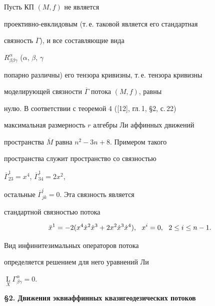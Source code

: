 \begin{pf}


Пусть КП $(M,f) $ не является


проективно-евклидовым (т.\,е. таковой является его стандартная


связность $\overline{\Gamma} $), и все составляющие вида


$R^{\alpha}_{\beta \beta \gamma} $ ($\alpha $, $\beta$, $\gamma$


попарно различны) его тензора кривизны, т.\,е. тензора кривизны


моделирующей связности $\overline{\Gamma} $ потока $(M,f) $, равны


нулю. В соответствии с теоремой 4 ([12], гл.\,1, \S 2, с.\,22)


максимальная размерность $r$ алгебры Ли аффинных движений


пространства $\overline{M} $ равна $n^2-3n+8$. Примером такого


пространства служит пространство со связностью


$\overline{\Gamma}^1_{23}=x^4 $, $\overline{\Gamma}^1_{34}=2x^2 $,


остальные $\overline{\Gamma}^i_{jk}=0$. Эта связность является


стандартной связностью потока


$$


\Ddot{x}^1=-2(x^4\dot{x}^2\dot{x}^3+2x^2\dot{x}^3 \dot{x}^4),\ \


x^i=0,\ \ 2\leq i \leq n-1.


$$





Вид инфинитезимальных операторов потока


определяется решением для него уравнений Ли


$\mathop{ L}\limits_{X}\Gamma^{\alpha}_{\beta \gamma}=0$.


\end{pf}


\medskip





\begin{center}


{\bf \S 2. Движения эквиаффинных квазигеодезических потоков}


\end{center}


\medskip





